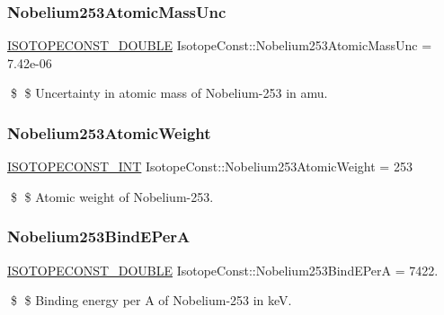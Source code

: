 \subsubsection{\texorpdfstring{Nobelium253\+Atomic\+Mass\+Unc}{Nobelium253AtomicMassUnc}}
{\footnotesize\ttfamily \mbox{\hyperlink{group___isotope_const-_macros_ga8f45a7272ce02c0b4c65c44636ed719a}{I\+S\+O\+T\+O\+P\+E\+C\+O\+N\+S\+T\+\_\+\+D\+O\+U\+B\+LE}} Isotope\+Const\+::\+Nobelium253\+Atomic\+Mass\+Unc = 7.\+42e-\/06}

\$ \$ Uncertainty in atomic mass of Nobelium-\/253 in amu. \mbox{\label{group___isotope_const-_nobelium-_no253_ga45ec1ba3f48d7869341c35dac41bc774}} 
\subsubsection{\texorpdfstring{Nobelium253\+Atomic\+Weight}{Nobelium253AtomicWeight}}
{\footnotesize\ttfamily \mbox{\hyperlink{group___isotope_const-_macros_ga5f18360b3e99483a35c32d789e62621c}{I\+S\+O\+T\+O\+P\+E\+C\+O\+N\+S\+T\+\_\+\+I\+NT}} Isotope\+Const\+::\+Nobelium253\+Atomic\+Weight = 253}

\$ \$ Atomic weight of Nobelium-\/253. \mbox{\label{group___isotope_const-_nobelium-_no253_gaf6eb8d0d98b28d096dccf8d4b14dda95}} 
\subsubsection{\texorpdfstring{Nobelium253\+Bind\+E\+PerA}{Nobelium253BindEPerA}}
{\footnotesize\ttfamily \mbox{\hyperlink{group___isotope_const-_macros_ga8f45a7272ce02c0b4c65c44636ed719a}{I\+S\+O\+T\+O\+P\+E\+C\+O\+N\+S\+T\+\_\+\+D\+O\+U\+B\+LE}} Isotope\+Const\+::\+Nobelium253\+Bind\+E\+PerA = 7422.}

\$ \$ Binding energy per A of Nobelium-\/253 in keV. \mbox{\label{group___isotope_const-_nobelium-_no253_ga6488928c1a7736d814a3941de054f669}} 
